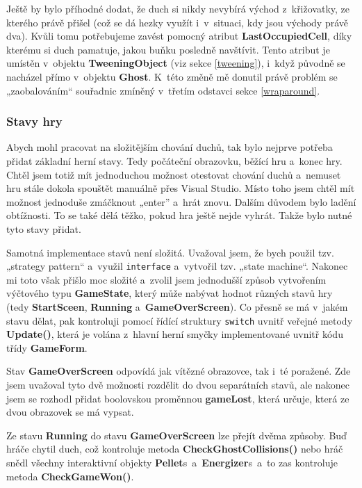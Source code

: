 \documentclass[a4]{article}
\begin{document}
Ještě by bylo příhodné dodat, že duch si nikdy nevybírá východ z~křižovatky, ze kterého právě přišel (což se dá hezky využít i~v~situaci, kdy jsou východy právě dva). Kvůli tomu potřebujeme zavést pomocný atribut \textbf{LastOccupiedCell}, díky kterému si duch pamatuje, jakou buňku posledně navštívit. Tento atribut je umístěn v~objektu \textbf{TweeningObject} (viz sekce \ref{tweening}), i~když původně se nacházel přímo v~objektu \textbf{Ghost}. K~této změně mě donutil právě problém se „zaobalováním“ souřadnic zmíněný v~třetím odstavci sekce \ref{wraparound}.

\subsubsection{Stavy hry} \label{gamestates}
Abych mohl pracovat na složitějším chování duchů, tak bylo nejprve potřeba přidat základní herní stavy. Tedy počáteční obrazovku, běžící hru a~konec hry. Chtěl jsem totiž mít jednoduchou možnost otestovat chování duchů a~nemuset hru stále dokola spouštět manuálně přes Visual Studio. Místo toho jsem chtěl mít možnost jednoduše zmáčknout „enter” a~hrát znovu. Dalším důvodem bylo ladění obtížnosti. To se také dělá těžko, pokud hra ještě nejde vyhrát. Takže bylo nutné tyto stavy přidat.

Samotná implementace stavů není složitá. Uvažoval jsem, že bych použil tzv. „strategy pattern“ a~využil \verb|interface| a~vytvořil tzv. „state machine“. Nakonec mi toto však přišlo moc složité a~zvolil jsem jednodušší způsob vytvořením výčtového typu \textbf{GameState}, který může nabývat hodnot různých stavů hry (tedy \textbf{StartSceen}, \textbf{Running} a~\textbf{GameOverScreen}). Co přesně se má v~jakém stavu dělat, pak kontroluji pomocí řídící struktury \verb|switch| uvnitř veřejné metody \textbf{Update()}, která je volána z~hlavní herní smyčky implementované uvnitř kódu třídy \textbf{GameForm}. 

Stav \textbf{GameOverScreen} odpovídá jak vítězné obrazovce, tak i~té poražené. Zde jsem uvažoval tyto dvě možnosti rozdělit do dvou separátních stavů, ale nakonec jsem se rozhodl přidat boolovskou proměnnou \textbf{gameLost}, která určuje, která ze dvou obrazovek se má vypsat.

Ze stavu \textbf{Running} do stavu \textbf{GameOverScreen} lze přejít dvěma způsoby. Buď hráče chytil duch, což kontroluje metoda \textbf{CheckGhostCollisions()} nebo hráč snědl všechny interaktivní objekty \textbf{Pellet}s~a~\textbf{Energizer}s~a~to zas kontroluje metoda \textbf{CheckGameWon()}.
\end{document}
